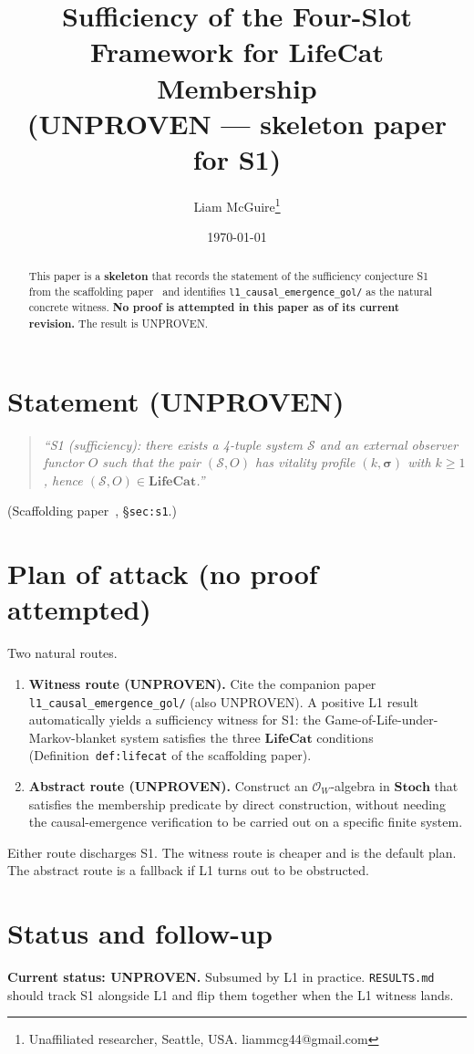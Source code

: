 \documentclass[11pt]{article}
\title{Sufficiency of the Four-Slot Framework for $\mathbf{LifeCat}$ Membership \\
       \large (UNPROVEN --- skeleton paper for S1)}
\author{Liam McGuire\thanks{Unaffiliated researcher, Seattle, USA. liammcg44@gmail.com}}
\date{\today}
\theoremstyle{plain}
\theoremstyle{definition}
\begin{document}
\maketitle

\begin{abstract}
This paper is a \textbf{skeleton} that records the statement of the
sufficiency conjecture S1 from the
scaffolding paper~\cite{emergent_systems_2026} and identifies
\texttt{l1\_causal\_emergence\_gol/} as the natural concrete witness.
\textbf{No proof is attempted in this paper as of its current
revision.} The result is UNPROVEN.
\end{abstract}

\section{Statement (UNPROVEN)}

\begin{quote}
\emph{``S1 (sufficiency): there exists a 4-tuple system $\mathcal{S}$ and
an external observer functor $O$ such that the pair $(\mathcal{S}, O)$
has vitality profile $(k, \boldsymbol{\sigma})$ with $k \geq 1$, hence
$(\mathcal{S}, O) \in \mathbf{LifeCat}$.''}
\end{quote}
\noindent (Scaffolding paper~\cite{emergent_systems_2026},
\S\texttt{sec:s1}.)

\section{Plan of attack (no proof attempted)}

Two natural routes.

\begin{enumerate}[leftmargin=2em,itemsep=4pt]
  \item \textbf{Witness route (UNPROVEN).} Cite the companion paper
    \texttt{l1\_causal\_emergence\_gol/} (also UNPROVEN). A positive L1
    result automatically yields a sufficiency witness for S1: the
    Game-of-Life-under-Markov-blanket system satisfies the three
    $\mathbf{LifeCat}$ conditions
    (Definition~\texttt{def:lifecat} of the scaffolding paper).
  \item \textbf{Abstract route (UNPROVEN).} Construct an
    $\mathcal{O}_W$-algebra in $\mathbf{Stoch}$ that satisfies the
    membership predicate by direct construction, without needing the
    causal-emergence verification to be carried out on a specific
    finite system.
\end{enumerate}

Either route discharges S1. The witness route is cheaper and is the
default plan. The abstract route is a fallback if L1 turns out to be
obstructed.

\section{Status and follow-up}

\textbf{Current status: UNPROVEN.} Subsumed by L1 in practice.
\texttt{RESULTS.md} should track S1 alongside L1 and flip them
together when the L1 witness lands.



\end{document}
